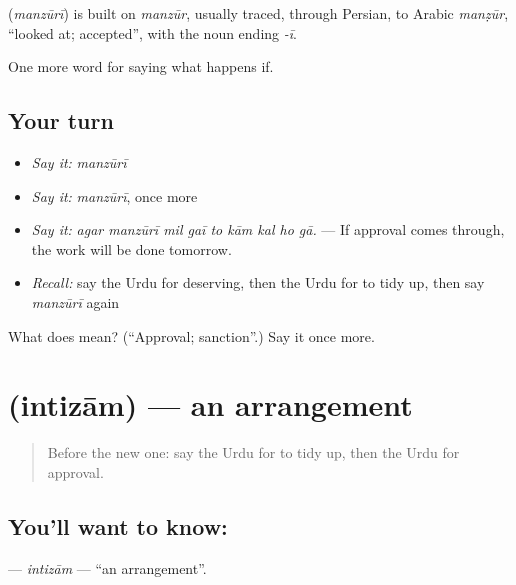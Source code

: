 \begin{cousinweb}
\textbf{} (\emph{manzūrī}) is built on \emph{manzūr}, usually traced, through Persian, to Arabic \emph{manẓūr}, \textquotedblleft{}looked at; accepted\textquotedblright{}, with the noun ending \emph{-ī}.
\end{cousinweb}

\begin{grammarlens}[title={What you've built}]
One more word for saying what happens if.
\end{grammarlens}

\subsection*{Your turn}
\begin{itemize}
\raggedright
  \item \emph{Say it:} \emph{manzūrī}
  \item \emph{Say it:} \emph{manzūrī}, once more
  \item \emph{Say it:} \emph{agar manzūrī mil gaī to kām kal ho gā.} — If approval comes through, the work will be done tomorrow.
  \item \emph{Recall:} say the Urdu for deserving, then the Urdu for to tidy up, then say \emph{manzūrī} again
\end{itemize}

\begin{tcolorbox}[breakable,colback=teal!4,colframe=teal!35!black,title={Before you move on}]
What does  mean? (\textquotedblleft{}Approval; sanction\textquotedblright{}.) Say it once more.
\end{tcolorbox}
\section[\texorpdfstring{\ur{انتظام} (intizām)}{انتظام (intizām)}]{ (intizām) — an arrangement}

\label{lesson:UR-C383-intizam}



\begin{quote}
Before the new one: say the Urdu for to tidy up, then the Urdu for approval.
\end{quote}

\subsection*{You'll want to know: }
\textbf{} — \emph{intizām} — \textquotedblleft{}an arrangement\textquotedblright{}.

